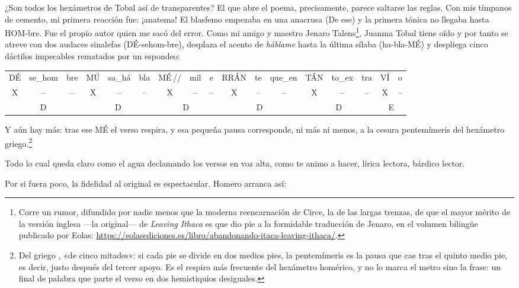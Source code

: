 ¿Son todos los hexámetros de Tobal así de transparentes? El que abre el poema, precisamente, parece saltarse las reglas. Con mis tímpanos de cemento, mi primera reacción fue: ¡anatema! El blasfemo empezaba en una anacrusa (De ese) y la primera tónica no llegaba hasta HOM-bre. Fue el propio autor quien me sacó del error. Como mi amigo y maestro Jenaro Talens\footnote{Corre un rumor, difundido por nadie menos que la moderna reencarnación de Circe, la de las largas trenzas, de que el mayor mérito de la versión inglesa ---la original--- de \emph{Leaving Ithaca} es que dio pie a la formidable traducción de Jenaro, en el volumen bilingüe publicado por Eolas: \url{https://eolasediciones.es/libro/abandonando-itaca-leaving-ithaca/}.}, Juanma Tobal tiene oído y por tanto se atreve con dos audaces sinalefas (DÉ-sehom-bre), desplaza el acento de \emph{háblame} hasta la última sílaba (ha-bla-MÉ) y despliega cinco dáctilos impecables rematados por un espondeo:

\begin{center}
\small\setlength{\tabcolsep}{3pt}
\begin{tabular}{ccc|ccc|ccc|ccc|ccc|cc}
DÉ & se\_hom & bre & MÚ & sa\_há & bla & MÉ\,// & mil & e & RRÁN & te & que\_en & TÁN & to\_ex & tra & VÍ & o \\
X & -- & -- & X & -- & -- & X & -- & -- & X & -- & -- & X & -- & -- & X & -- \\
\multicolumn{3}{c|}{D} & \multicolumn{3}{c|}{D} & \multicolumn{3}{c|}{D} & \multicolumn{3}{c|}{D} & \multicolumn{3}{c|}{D} & \multicolumn{2}{c}{E} \\
\end{tabular}
\end{center}

Y aún hay más: tras ese MÉ el verso respira, y esa pequeña pausa corresponde, ni más ni menos, a la cesura pentemímeris del hexámetro griego.\footnote{Del griego , «de cinco mitades»: si cada pie se divide en dos medios pies, la pentemímeris es la pausa que cae tras el quinto medio pie, es decir, justo después del tercer apoyo. Es el respiro más frecuente del hexámetro homérico, y no lo marca el metro sino la frase: un final de palabra que parte el verso en dos hemistiquios desiguales.} 

Todo lo cual queda claro como el agua declamando los versos en voz alta, como te animo a hacer, lírica lectora, bárdico lector. 

Por si fuera poco, la fidelidad al original es espectacular. Homero arranca así:

